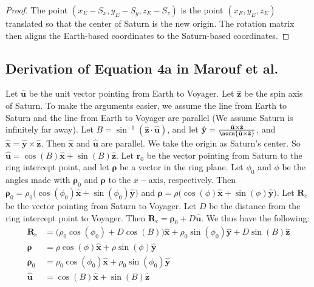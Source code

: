 \documentclass[crop=false,class=book,oneside]{standalone}
\begin{document}
            \begin{proof}
            The point $(x_{E}-S_{x}, y_{E}-S_{y}, z_{E}-S_{z})$ is the point $(x_{E},y_{E},z_{E})$ translated so that the center of Saturn is the new origin. The rotation matrix then aligns the Earth-based coordinates to the Saturn-based coordinates.
            \end{proof}
        \subsection{Derivation of Equation 4a in Marouf et al.}
            Let $\hat{\mathbf{u}}$ be the unit vector pointing from Earth to Voyager. Let $\hat{\mathbf{z}}$ be the spin axis of Saturn. To make the arguments easier, we assume the line from Earth to Saturn and the line from Earth to Voyager are parallel (We assume Saturn is infinitely far away). Let $B = \sin^{-1}(\hat{\mathbf{z}}\cdot \hat{\mathbf{u}})$, and let $\hat{\mathbf{y}} = \frac{\hat{\mathbf{u}}\times \hat{\mathbf{z}}}{\norm{\hat{\mathbf{u}}\times \hat{\mathbf{z}}}}$, and $\hat{\mathbf{x}} = \hat{\mathbf{y}}\times \hat{\mathbf{z}}$. Then $\hat{\mathbf{x}}$ and $\hat{\mathbf{u}}$ are parallel. We take the origin as Saturn's center. So $\hat{\mathbf{u}} = \cos(B)\hat{\mathbf{x}}+\sin(B)\hat{\mathbf{z}}$. Let $\mathbf{r}_{0}$ be the vector pointing from Saturn to the ring intercept point, and let $\boldsymbol{\rho}$ be a vector in the ring plane. Let $\phi_0$ and $\phi$ be the angles made with $\boldsymbol{\rho}_0$ and $\boldsymbol{\rho}$ to the $x-$axis, respectively. Then $\boldsymbol{\rho}_{0} = \rho_{0}\big(\cos(\phi_0)\hat{\mathbf{x}}+\sin(\phi_{0})\hat{\mathbf{y}}\big)$ and $\boldsymbol{\rho} = \rho\big(\cos(\phi)\hat{\mathbf{x}}+\sin(\phi)\hat{\mathbf{y}}\big)$. Let $\mathbf{R}_{c}$ be the vector pointing from Saturn to Voyager. Let $D$ be the distance from the ring intercept point to Voyager. Then $\mathbf{R}_{c} = \boldsymbol{\rho}_{0}+D\hat{\mathbf{u}}$. We thus have the following:
            \begin{align*}
            \mathbf{R}_{c} &= \big(\rho_{0}\cos(\phi_0)+D\cos(B)\big)\hat{\mathbf{x}}+\rho_{0}\sin(\phi_{0})\hat{\mathbf{y}}+D\sin(B)\hat{\mathbf{z}}\\
            \boldsymbol{\rho} &= \rho\cos(\phi)\hat{\mathbf{x}}+\rho\sin(\phi)\hat{\mathbf{y}}\\
            \boldsymbol{\rho}_{0} &= \rho_{0}\cos(\phi_0)\hat{\mathbf{x}}+\rho_{0}\sin(\phi_{0})\hat{\mathbf{y}}\\
            \hat{\mathbf{u}} &= \cos(B)\hat{\mathbf{x}}+\sin(B)\hat{\mathbf{z}}
            \end{align*}
\end{document}
